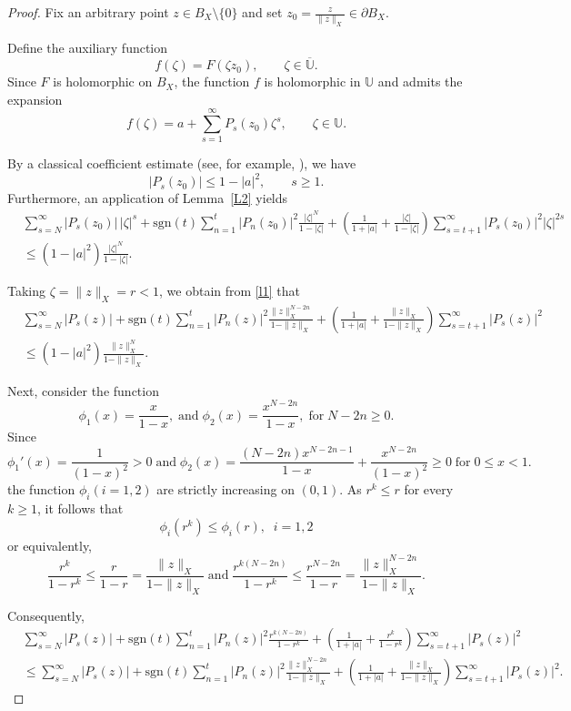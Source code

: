 \documentclass[10pt,a4paper]{amsart}
\begin{document}
\begin{proof}
Fix an arbitrary point $z\in B_X\setminus\{0\}$ and set $z_0=\frac{z}{\|z\|_X}\in \partial B_X.$

Define the auxiliary function
\[
f(\zeta)=F(\zeta z_0), \qquad \zeta\in \overline{\mathbb U}.
\]
Since $F$ is holomorphic on $B_X$, the function $f$ is holomorphic in $\mathbb U$ and admits the expansion
\[
f(\zeta)=a+\sum_{s=1}^{\infty}P_s(z_0)\zeta^s,
\qquad \zeta\in\mathbb U.
\]

By a classical coefficient estimate (see, for example, \cite[p.~35]{GK2003}), we have
\begin{equation}\label{l0}
|P_s(z_0)|\le 1-|a|^2,\qquad s\ge1.
\end{equation}
Furthermore, an application of Lemma~\ref{L2} yields
\begin{align}
&\sum_{s=N}^{\infty}|P_s(z_0)|\,|\zeta|^s+\text{sgn}(t)\sum_{n=1}^t|P_n(z_0)|^2\frac{|\zeta|^N}{1-|\zeta|}
+\left(\frac{1}{1+|a|}+\frac{|\zeta|}{1-|\zeta|}\right)
\sum_{s=t+1}^{\infty}|P_s(z_0)|^2|\zeta|^{2s}
\nonumber\\
&\le
(1-|a|^2)\frac{|\zeta|^N}{1-|\zeta|}.
\label{l1}
\end{align}

Taking $\zeta=\|z\|_X=r<1$, we obtain from \eqref{l1} that
\begin{align}
&\sum_{s=N}^{\infty}|P_s(z)|
+\text{sgn}(t)\sum_{n=1}^t|P_n(z)|^2\frac{\|z\|_X^{N-2n}}{1-\|z\|_X}
+\left(\frac{1}{1+|a|}
+\frac{\|z\|_X}{1-\|z\|_X}\right)
\sum_{s=t+1}^{\infty}|P_s(z)|^2
\nonumber\\
&\le
(1-|a|^2)\frac{\|z\|_X^N}{1-\|z\|_X}.
\label{hhh1}
\end{align}

Next, consider the function
\[
\phi_1(x)=\frac{x}{1-x}, \;\text{and}\;\phi_2(x)=\frac{x^{N-2n}}{1-x}, \;\text{for}\;N-2n\geq 0.
\]
Since
\[
\phi_1'(x)=\frac{1}{(1-x)^2}>0\;\text{and}\; \phi_2(x)=\frac{(N-2n)x^{N-2n-1}}{1-x}+\frac{x^{N-2n}}{(1-x)^2}\geq 0 \;\text{for}\;0\leq x<1.
\]
the function $\phi_i(i=1,2)$ are strictly increasing on $(0,1)$. As $r^k\le r$ for every $k\ge1$, it follows that
\[
\phi_i(r^k)\le \phi_i(r),\; \;i=1,2
\]
or equivalently,
\[
\frac{r^k}{1-r^k}
\le
\frac{r}{1-r}
=
\frac{\|z\|_X}{1-\|z\|_X}\;\text{and}\; \frac{r^{k(N-2n)}}{1-r^k}\leq \frac{r^{N-2n}}{1-r}=\frac{\|z\|_X^{N-2n}}{1-\|z\|_X}.
\]

Consequently,
\begin{align}
&\sum_{s=N}^{\infty}|P_s(z)|
+\text{sgn}(t)\sum_{n=1}^t|P_n(z)|^2\frac{r^{k(N-2n)}}{1-r^k}
+\left(\frac{1}{1+|a|}
+\frac{r^k}{1-r^k}\right)
\sum_{s=t+1}^{\infty}|P_s(z)|^2
\nonumber\\
&\le
\sum_{s=N}^{\infty}|P_s(z)|
+\text{sgn}(t)\sum_{n=1}^t|P_n(z)|^2\frac{\|z\|_X^{N-2n}}{1-\|z\|_X}
+\left(\frac{1}{1+|a|}
+\frac{\|z\|_X}{1-\|z\|_X}\right)
\sum_{s=t+1}^{\infty}|P_s(z)|^2.
\label{aq1}
\end{align}


\end{proof}
\end{document}
